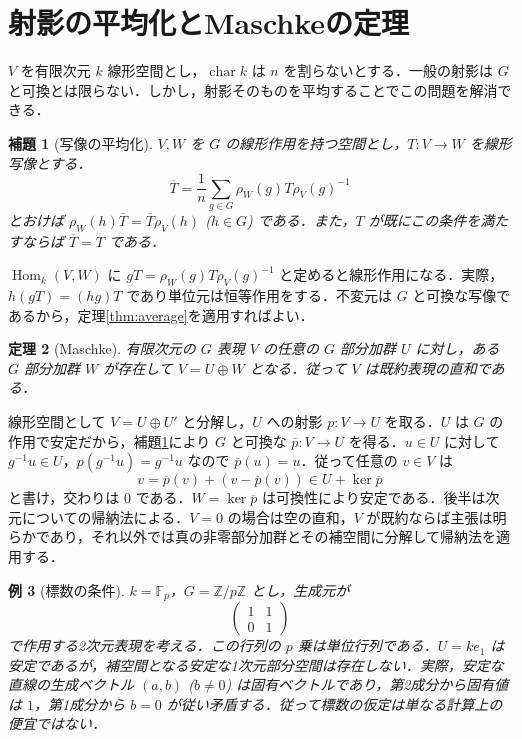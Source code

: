 \documentclass[a5paper,10pt,onecolumn]{jsarticle}
\makeatletter
\theoremstyle{mathnotetheorem}
\newtheorem{theorem}{定理}[section]
\newtheorem{lemma}[theorem]{補題}
\newtheorem{example}[theorem]{例}
\renewcommand{\proofname}{証明}
\renewenvironment{proof}[1][\proofname]{%
  \par\pushQED{\qed}\normalfont\topsep4\p@\@plus2\p@\relax
  \trivlist\item[\hskip\labelsep\bfseries #1]\ignorespaces
}{\popQED\endtrivlist\@endpefalse}
\makeatother
\begin{document}
\section{射影の平均化とMaschkeの定理}
$V$ を有限次元 $k$ 線形空間とし，$\operatorname{char}k$ は $n$ を割らないとする．一般の射影は $G$ と可換とは限らない．しかし，射影そのものを平均することでこの問題を解消できる．
\begin{lemma}[写像の平均化]\label{lem:hom}
$V,W$ を $G$ の線形作用を持つ空間とし，$T:V\to W$ を線形写像とする．
\[
 \overline T=\frac1n\sum_{g\in G}\rho_W(g)T\rho_V(g)^{-1}
\]
とおけば $\rho_W(h)\overline T=\overline T\rho_V(h)$ ($h\in G$) である．また，$T$ が既にこの条件を満たすならば $\overline T=T$ である．
\end{lemma}
\begin{proof}
$\operatorname{Hom}_k(V,W)$ に $gT=\rho_W(g)T\rho_V(g)^{-1}$ と定めると線形作用になる．実際，$h(gT)=(hg)T$ であり単位元は恒等作用をする．不変元は $G$ と可換な写像であるから，定理\ref{thm:average}を適用すればよい．
\end{proof}
\begin{theorem}[Maschke]\label{thm:maschke}
有限次元の $G$ 表現 $V$ の任意の $G$ 部分加群 $U$ に対し，ある $G$ 部分加群 $W$ が存在して $V=U\oplus W$ となる．従って $V$ は既約表現の直和である．
\end{theorem}
\begin{proof}
線形空間として $V=U\oplus U'$ と分解し，$U$ への射影 $p:V\to U$ を取る．$U$ は $G$ の作用で安定だから，補題\ref{lem:hom}により $G$ と可換な $\overline p:V\to U$ を得る．$u\in U$ に対して $g^{-1}u\in U$，$p(g^{-1}u)=g^{-1}u$ なので $\overline p(u)=u$．従って任意の $v\in V$ は
\[
 v=\overline p(v)+(v-\overline p(v))\in U+\ker\overline p
\]
と書け，交わりは $0$ である．$W=\ker\overline p$ は可換性により安定である．後半は次元についての帰納法による．$V=0$ の場合は空の直和，$V$ が既約ならば主張は明らかであり，それ以外では真の非零部分加群とその補空間に分解して帰納法を適用する．
\end{proof}
\begin{example}[標数の条件]
$k=\mathbb F_p$，$G=\mathbb Z/p\mathbb Z$ とし，生成元が
\[
 \begin{pmatrix}1&1\\0&1\end{pmatrix}
\]
で作用する2次元表現を考える．この行列の $p$ 乗は単位行列である．$U=ke_1$ は安定であるが，補空間となる安定な1次元部分空間は存在しない．実際，安定な直線の生成ベクトル $(a,b)$ ($b\ne0$) は固有ベクトルであり，第2成分から固有値は $1$，第1成分から $b=0$ が従い矛盾する．従って標数の仮定は単なる計算上の便宜ではない．
\end{example}
\end{document}
